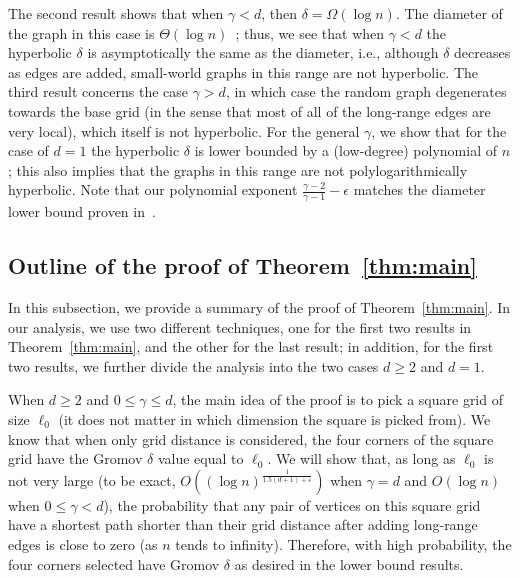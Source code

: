 \documentclass[11pt]{article}
\begin{document}
The second result shows that when $\gamma < d$, then $\delta=\Omega(\log n)$.
The diameter of the graph in this case is $\Theta(\log n)$~\cite{MN04}; 
thus, we see that when $\gamma < d$ the hyperbolic $\delta$ is asymptotically 
the same as the diameter, i.e., although $\delta$ decreases as edges are 
added, small-world graphs in this range are not hyperbolic.
The third result concerns the case $\gamma > d$, in which case the
random graph degenerates towards the base grid (in the sense that most of all 
of the long-range edges are very local), which itself is not hyperbolic.
For the general $\gamma$, we show that for the case of
	 $d=1$ the hyperbolic $\delta$ is lower bounded by a (low-degree)
	polynomial of $n$; this also 
implies that the graphs in this range are not polylogarithmically hyperbolic.
Note that our polynomial exponent $\frac{\gamma-2}{\gamma-1}-\epsilon$
	matches the diameter lower bound proven in~\cite{NM05}.

\subsection{Outline of the proof of Theorem~\ref{thm:main}} 
\label{sec:swoutline}

In this subsection, we provide a summary of the proof of 
Theorem~\ref{thm:main}.
In our analysis, we use two different techniques, one for the first two 
results in Theorem~\ref{thm:main}, and the other for the last result; 
in addition, for the first two results, we further divide the analysis into 
the two cases $d\ge 2$ and $d=1$.

When $d\ge 2$ and $0 \le \gamma \le d$, the main idea of the proof is to 
pick a square grid of size $\ell_0$ (it does not matter in which dimension 
the square is picked from). 
We know that when only grid distance is considered, 
	the four corners of the square grid
	have the Gromov $\delta$ value equal to $\ell_0$.
We will show that, as long as $\ell_0$ is not very large 
	(to be exact, $O((\log n)^{\frac{1}{1.5(d+1)+\varepsilon}})$ when $\gamma = d$ and
	$O(\log n)$ when $0 \le \gamma < d$), 
	the probability that any pair of vertices on this square grid have
	a shortest path shorter than their grid distance after
	adding long-range edges is close to zero (as $n$ tends to
	infinity).
Therefore, with high probability, the four corners selected have
	Gromov $\delta$ as desired in the lower bound results.
\end{document}
